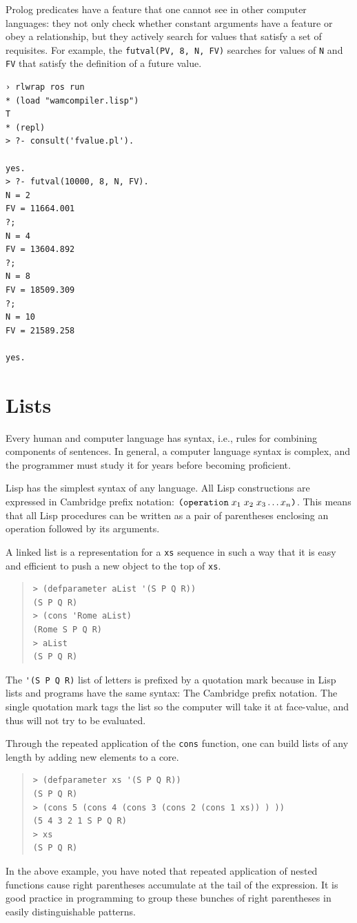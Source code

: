 \documentclass[a4paper,12pt]{book}
\begin{document}
Prolog predicates have a feature that one cannot see in
other computer languages: they not only check whether
constant arguments have a feature or obey a relationship,
but they actively search for values that satisfy a
set of requisites. For example, the \verb|futval(PV, 8, N, FV)|
searches for values of \verb|N| and \verb|FV| that satisfy
the definition of a future value.

\begin{verbatim}
› rlwrap ros run
* (load "wamcompiler.lisp")
T
* (repl)
> ?- consult('fvalue.pl').

yes.
> ?- futval(10000, 8, N, FV).
N = 2
FV = 11664.001
?;
N = 4
FV = 13604.892
?;
N = 8
FV = 18509.309
?;
N = 10
FV = 21589.258

yes.
\end{verbatim}

\pagebreak
\section{Lists}
Every human and computer language
has syntax, i.e., rules for combining
components of sentences.
In general, a computer language
syntax is complex, and the programmer
must study it for years before
becoming proficient.

Lisp has the simplest syntax
of any language. All
Lisp constructions are expressed
in Cambridge prefix notation:
$\verb|(operation|\;x_1\;x_2\;x_3\ldots x_n\verb|)|$.
This means that all Lisp procedures  can be written 
as a pair of parentheses enclosing an operation
followed by its arguments. 

A linked list is a representation for
a \verb|xs| sequence  in such a way
that it is easy and efficient to
push a new object to the top of \verb|xs|.
\begin{quote}
\begin{verbatim}
> (defparameter aList '(S P Q R))
(S P Q R)
> (cons 'Rome aList)
(Rome S P Q R)
> aList
(S P Q R)
\end{verbatim}
\end{quote}
The \verb|'(S P Q R)| list of letters
is prefixed by a quotation mark because
in Lisp lists and programs have the
same syntax: The Cambridge prefix notation.
The single quotation mark
tags the list so the computer will
take it at face-value, and thus will
not try to be evaluated.

Through the repeated application of the
\verb|cons| function, one can
build lists of any length
by adding new elements to
a core.
\begin{quote}
\begin{verbatim}
> (defparameter xs '(S P Q R))
(S P Q R)
> (cons 5 (cons 4 (cons 3 (cons 2 (cons 1 xs)) ) ))
(5 4 3 2 1 S P Q R)
> xs
(S P Q R)
\end{verbatim}
\end{quote}
In the above example, you have noted
that repeated application of nested functions
cause right parentheses accumulate
at the tail of the expression.
It is good practice in programming
to group these bunches of right parentheses
in easily distinguishable patterns.
\end{document}
